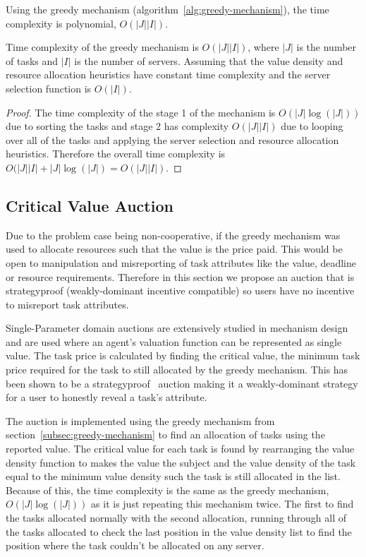 Using the greedy mechanism (algorithm~\ref{alg:greedy-mechanism}), the time complexity is polynomial,
$O(\left|J\right| \left|I\right|)$.
\begin{theorem}
    Time complexity of the greedy mechanism is $O(\left|J\right| \left|I\right|)$, where $\left|J\right|$ is the number
    of tasks and $\left|I\right|$ is the number of servers. Assuming that the value density and resource allocation
    heuristics have constant time complexity and the server selection function is $O(\left|I\right|)$.
\end{theorem}
\begin{proof}
    The time complexity of the stage 1 of the mechanism is $O(\left|J\right| \log(\left|J\right|))$ due to sorting the
    tasks and stage 2 has complexity $O(\left|J\right| \left|I\right|)$ due to looping over all of the tasks and
    applying the server selection and resource allocation heuristics. Therefore the overall time complexity is
    $O(\left|J\right| \left|I\right| + \left|J\right| \log(\left|J\right|) = O(\left|J\right| \left|I\right|)$.
\end{proof}

\subsection{Critical Value Auction}\label{subsec:critical-value-auction}
Due to the problem case being non-cooperative, if the greedy mechanism was used to allocate resources such that the
value is the price paid. This would be open to manipulation and misreporting of task attributes like the value,
deadline or resource requirements. Therefore in this section we propose an auction that is strategyproof
(weakly-dominant incentive compatible) so users have no incentive to misreport task attributes.

Single-Parameter domain auctions are extensively studied in mechanism design~\cite{nisan2007algorithmic_228} and are
used where an agent's valuation function can be represented as single value. The task price is calculated by finding
the critical value, the minimum task price required for the task to still allocated by the greedy mechanism. This has
been shown to be a strategyproof~\cite{nisan2007algorithmic_229_230} auction making it a weakly-dominant strategy for
a user to honestly reveal a task's attribute.

The auction is implemented using the greedy mechanism from section~\ref{subsec:greedy-mechanism} to find an allocation
of tasks using the reported value. The critical value for each task is found by rearranging the value density function
to makes the value the subject and the value density of the task equal to the minimum value density such the task is
still allocated in the list. Because of this, the time complexity is the same as the greedy mechanism,
$O(\left|J\right| \log(\left|J\right|))$ as it is just repeating this mechanism twice. The first to find the tasks
allocated normally with the second allocation, running through all of the tasks allocated to check the last position
in the value density list to find the position where the task couldn't be allocated on any server.

